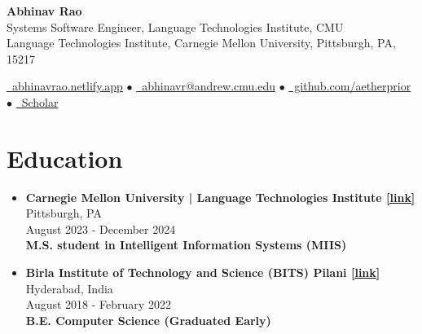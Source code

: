 \documentclass[11pt,letterpaper]{article}
\begin{document}
    
    \begin{center}
        {\Huge\bfseries Abhinav Rao}\\[2mm]
        {\large Systems Software Engineer, Language Technologies Institute, CMU}\\[1mm]
        {\small Language Technologies Institute, Carnegie Mellon University,
            Pittsburgh, PA, 15217}
    \end{center}
    
    \begin{center}
    \href{https://abhinavrao.netlify.app}{\faGlobe\ abhinavrao.netlify.app} $\bullet$ \href{mailto:abhinavr@andrew.cmu.edu}{\faEnvelope\ abhinavr@andrew.cmu.edu} $\bullet$ \href{https://github.com/aetherprior}{\faGithub\ github.com/aetherprior} $\bullet$ \href{https://scholar.google.com/citations?user=U_wk4ssAAAAJ}{\faGraduationCap\ Scholar}
    \end{center}
    
    \section*{Education}
    \begin{itemize}[leftmargin=*,label={},itemsep=4pt]
        \item \textbf{Carnegie Mellon University | Language Technologies Institute  \href{https://lti.cs.cmu.edu}{[link]}} \hfill Pittsburgh, PA\\
            August 2023 - December 2024\\
            \textbf{\textit{} M.S. student in Intelligent
                    Information Systems (MIIS)}
        \item \textbf{Birla Institute of Technology and Science (BITS) Pilani  \href{https://www.bits-pilani.ac.in/hyderabad/}{[link]}} \hfill Hyderabad, India\\
            August 2018 - February 2022\\
            \textbf{\textit{} B.E. Computer Science (Graduated
                    Early)}
    \end{itemize}
    
\end{document}
